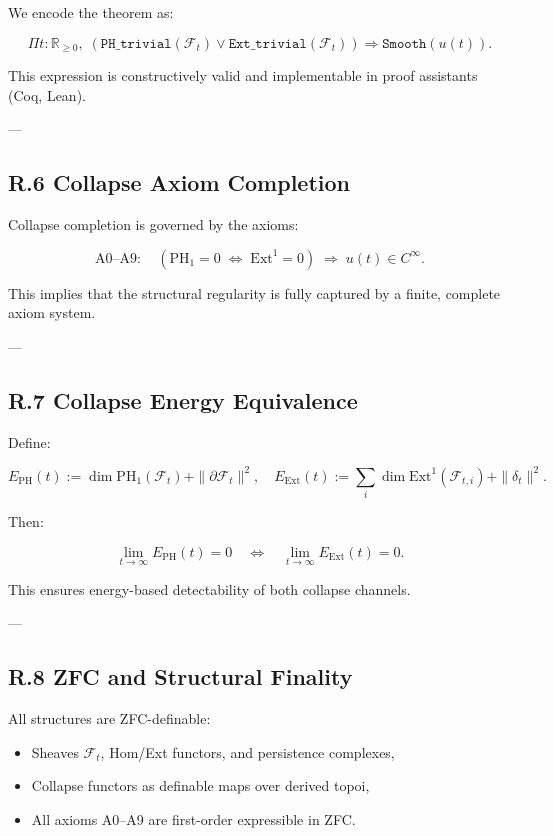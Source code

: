 \documentclass[11pt]{article}
\begin{document}
{We encode the theorem as:

\[
\Pi t : \mathbb{R}_{\ge 0},\;
\left(
\texttt{PH\_trivial}(\mathcal{F}_t)
\vee
\texttt{Ext\_trivial}(\mathcal{F}_t)
\right)
\Rightarrow
\texttt{Smooth}(u(t)).
\]

This expression is constructively valid and implementable in proof assistants (Coq, Lean).

---

\subsection*{R.6 Collapse Axiom Completion}

Collapse completion is governed by the axioms:

\[
\text{A0–A9}: \quad
(\mathrm{PH}_1 = 0 \;\Leftrightarrow\; \mathrm{Ext}^1 = 0) \;\Rightarrow\; u(t) \in C^\infty.
\]

This implies that the structural regularity is fully captured by a finite, complete axiom system.

---

\subsection*{R.7 Collapse Energy Equivalence}

Define:

\[
E_{\mathrm{PH}}(t) := \dim \mathrm{PH}_1(\mathcal{F}_t) + \|\partial \mathcal{F}_t\|^2, \quad
E_{\mathrm{Ext}}(t) := \sum_i \dim \mathrm{Ext}^1(\mathcal{F}_{t,i}) + \|\delta_t\|^2.
\]

Then:

\[
\lim_{t \to \infty} E_{\mathrm{PH}}(t) = 0
\quad \Leftrightarrow \quad
\lim_{t \to \infty} E_{\mathrm{Ext}}(t) = 0.
\]

This ensures energy-based detectability of both collapse channels.

---

\subsection*{R.8 ZFC and Structural Finality}

All structures are ZFC-definable:
\begin{itemize}
  \item Sheaves $\mathcal{F}_t$, Hom/Ext functors, and persistence complexes,
  \item Collapse functors as definable maps over derived topoi,
  \item All axioms A0–A9 are first-order expressible in ZFC.
\end{itemize}

}
\end{document}
